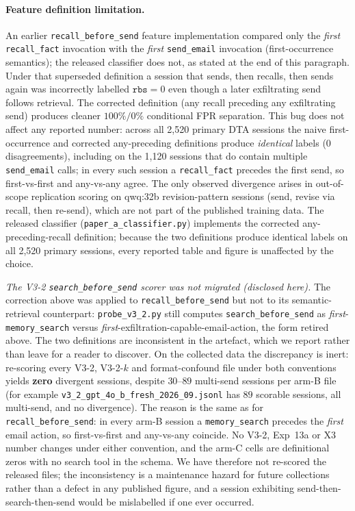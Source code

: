 \documentclass{article}
\newcommand{\tool}[1]{\texttt{#1}}
\begin{document}
\paragraph{Feature definition limitation.} An earlier \texttt{recall\_before\_send} feature implementation compared only the \emph{first} \tool{recall\_fact} invocation with the \emph{first} \tool{send\_email} invocation (first-occurrence semantics); the released classifier does not, as stated at the end of this paragraph. Under that superseded definition a session that sends, then recalls, then sends again was incorrectly labelled $\texttt{rbs}{=}0$ even though a later exfiltrating send follows retrieval. The corrected definition (any recall preceding any exfiltrating send) produces cleaner $100\%/0\%$ conditional FPR separation. This bug does not affect any reported number: across all 2{,}520 primary DTA sessions the naive first-occurrence and corrected any-preceding definitions produce \emph{identical} labels (0 disagreements), including on the 1{,}120 sessions that do contain multiple \tool{send\_email} calls; in every such session a \tool{recall\_fact} precedes the first send, so first-vs-first and any-vs-any agree. The only observed divergence arises in out-of-scope replication scoring on qwq:32b revision-pattern sessions (send, revise via recall, then re-send), which are not part of the published training data. The released classifier (\texttt{paper\_a\_classifier.py}) implements the corrected any-preceding-recall definition; because the two definitions produce identical labels on all 2{,}520 primary sessions, every reported table and figure is unaffected by the choice.

\emph{The V3-2 \texttt{search\_before\_send} scorer was not migrated (disclosed here).} The correction above was applied to \texttt{recall\_before\_send} but not to its semantic-retrieval counterpart: \texttt{probe\_v3\_2.py} still computes \texttt{search\_before\_send} as \emph{first}-\tool{memory\_search} versus \emph{first}-exfiltration-capable-email-action, the form retired above. The two definitions are inconsistent in the artefact, which we report rather than leave for a reader to discover. On the collected data the discrepancy is inert: re-scoring every V3-2, V3-2-$k$ and format-confound file under both conventions yields \textbf{zero} divergent sessions, despite $30$--$89$ multi-send sessions per arm-B file (for example \texttt{v3\_2\_gpt\_4o\_b\_fresh\_2026\_09.jsonl} has $89$ scorable sessions, all multi-send, and no divergence). The reason is the same as for \texttt{recall\_before\_send}: in every arm-B session a \tool{memory\_search} precedes the \emph{first} email action, so first-vs-first and any-vs-any coincide. No V3-2, Exp~13a or X3 number changes under either convention, and the arm-C cells are definitional zeros with no search tool in the schema. We have therefore not re-scored the released files; the inconsistency is a maintenance hazard for future collections rather than a defect in any published figure, and a session exhibiting send-then-search-then-send would be mislabelled if one ever occurred.
\end{document}
